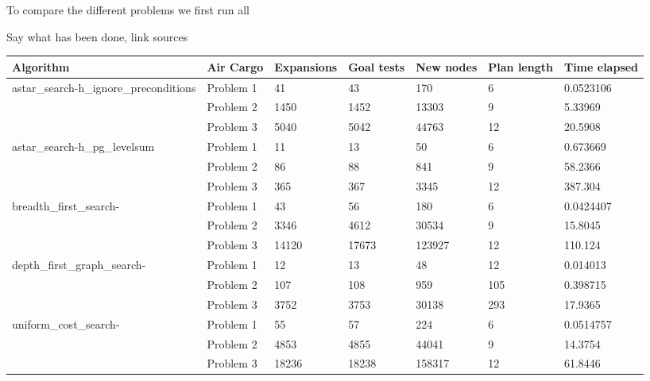 \documentclass{article}
\begin{document}
To compare the different problems we first run all

Say what has been done, link sources
\begin{center}
\begin{footnotesize}
\begin{tabular}{lllllll}
\toprule
Algorithm & Air Cargo  & Expansions & Goal tests & New nodes & Plan length & Time elapsed \\
\midrule
astar\_search-h\_ignore\_preconditions & Problem 1 &         41 &         43 &       170 &           6 &    0.0523106 \\
                 & Problem 2 &       1450 &       1452 &     13303 &           9 &      5.33969 \\
                 & Problem 3 &       5040 &       5042 &     44763 &          12 &      20.5908 \\
astar\_search-h\_pg\_levelsum & Problem 1 &         11 &         13 &        50 &           6 &     0.673669 \\
                 & Problem 2 &         86 &         88 &       841 &           9 &      58.2366 \\
                 & Problem 3 &        365 &        367 &      3345 &          12 &      387.304 \\
breadth\_first\_search- & Problem 1 &         43 &         56 &       180 &           6 &    0.0424407 \\
                 & Problem 2 &       3346 &       4612 &     30534 &           9 &      15.8045 \\
                 & Problem 3 &      14120 &      17673 &    123927 &          12 &      110.124 \\
depth\_first\_graph\_search- & Problem 1 &         12 &         13 &        48 &          12 &     0.014013 \\
                 & Problem 2 &        107 &        108 &       959 &         105 &     0.398715 \\
                 & Problem 3 &       3752 &       3753 &     30138 &         293 &      17.9365 \\
uniform\_cost\_search- & Problem 1 &         55 &         57 &       224 &           6 &    0.0514757 \\
                 & Problem 2 &       4853 &       4855 &     44041 &           9 &      14.3754 \\
                 & Problem 3 &      18236 &      18238 &    158317 &          12 &      61.8446 \\
\bottomrule
\end{tabular}
\end{footnotesize}
\end{center}
\end{document}
